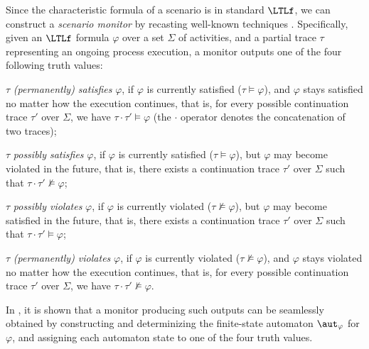 Since the characteristic formula of a scenario is in standard $\LTLf$, we can construct a \emph{scenario monitor} by recasting well-known techniques \cite{MMWV11,DDGM14}. Specifically, given an $\LTLf$ formula $\varphi$ over a set $\Sigma$ of activities, and a partial trace $\tau$ representing an ongoing process execution, a monitor outputs one of the four following truth values:
\begin{compactitem}[$\bullet$]
\item $\tau$ \emph{(permanently) satisfies} $\varphi$, if $\varphi$ is currently satisfied ($\tau \models \varphi$), and $\varphi$ stays satisfied no matter how the execution continues, that is, for every possible continuation trace $\tau'$ over $\Sigma$, we have $\tau \cdot \tau' \models \varphi$ (the $\cdot$ operator denotes the concatenation of two traces);
\item $\tau$ \emph{possibly satisfies} $\varphi$, if $\varphi$ is currently satisfied ($\tau \models \varphi$), but $\varphi$ may become violated in the future, that is, there exists a continuation trace $\tau'$ over $\Sigma$ such that $\tau \cdot \tau' \not\models \varphi$;
\item $\tau$ \emph{possibly violates} $\varphi$, if $\varphi$ is currently violated ($\tau \not\models \varphi$), but $\varphi$ may become satisfied in the future, that is, there exists a continuation trace $\tau'$ over $\Sigma$ such that $\tau \cdot \tau' \models \varphi$;
\item $\tau$ \emph{(permanently) violates} $\varphi$, if $\varphi$ is currently violated ($\tau \not\models \varphi$), and $\varphi$ stays violated no matter how the execution continues, that is, for every possible continuation trace $\tau'$ over $\Sigma$, we have $\tau \cdot \tau' \not\models \varphi$.
\end{compactitem}
In \cite{MMWV11,DDGM14}, it is shown that a monitor producing such outputs can be seamlessly obtained by constructing and determinizing the finite-state automaton $\aut_\varphi$ for $\varphi$, and assigning each automaton state to one of the four truth values.

